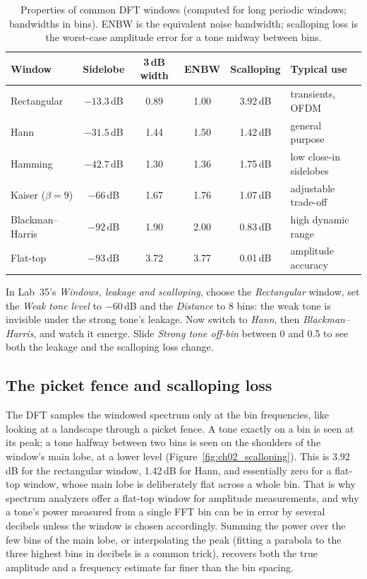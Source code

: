 \begin{table}[htbp]\centering\small
\caption{Properties of common DFT windows (computed for long periodic windows; bandwidths in bins).
ENBW is the equivalent noise bandwidth; scalloping loss is the worst-case amplitude error for a tone
midway between bins.}\label{tab:ch02:windows}
\begin{tabular}{@{}lccccl@{}}
\toprule
Window & Sidelobe & 3\,dB width & ENBW & Scalloping & Typical use\\
\midrule
Rectangular & $-13.3$\,dB & 0.89 & 1.00 & 3.92\,dB & transients, OFDM\\
Hann & $-31.5$\,dB & 1.44 & 1.50 & 1.42\,dB & general purpose\\
Hamming & $-42.7$\,dB & 1.30 & 1.36 & 1.75\,dB & low close-in sidelobes\\
Kaiser ($\beta=9$) & $-66$\,dB & 1.67 & 1.76 & 1.07\,dB & adjustable trade-off\\
Blackman--Harris & $-92$\,dB & 1.90 & 2.00 & 0.83\,dB & high dynamic range\\
Flat-top & $-93$\,dB & 3.72 & 3.77 & 0.01\,dB & amplitude accuracy\\
\bottomrule
\end{tabular}
\end{table}

\begin{tryit}
In Lab~35's \emph{Windows, leakage and scalloping}, choose the \emph{Rectangular} window, set the
\emph{Weak tone level} to $-60$\,dB and the \emph{Distance} to 8 bins: the weak tone is invisible
under the strong tone's leakage. Now switch to \emph{Hann}, then \emph{Blackman--Harris}, and watch it
emerge. Slide \emph{Strong tone off-bin} between 0 and 0.5 to see both the leakage and the
scalloping loss change.
\end{tryit}

\subsection{The picket fence and scalloping loss}

The DFT samples the windowed spectrum only at the bin frequencies, like looking at a landscape
through a picket fence. A tone exactly on a bin is seen at its peak; a tone halfway between two bins
is seen on the shoulders of the window's main lobe, at a lower level
(Figure~\ref{fig:ch02_scalloping}). This  is 3.92\,dB for the rectangular
window, 1.42\,dB for Hann, and essentially zero for a flat-top window, whose main lobe is
deliberately flat across a whole bin. That is why spectrum analyzers offer a flat-top window for
amplitude measurements, and why a tone's power measured from a single FFT bin can be in error by
several decibels unless the window is chosen accordingly. Summing the power over the few bins of the
main lobe, or interpolating the peak (fitting a parabola to the three highest bins in decibels is a
common trick), recovers both the true amplitude and a frequency estimate far finer than the bin
spacing.

